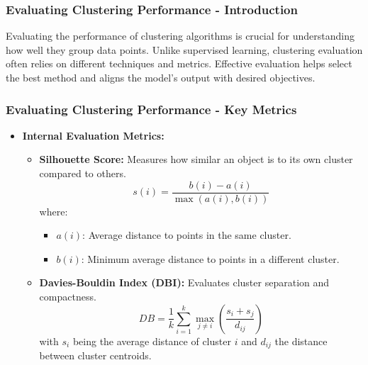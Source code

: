 \documentclass[aspectratio=169]{beamer}
\begin{document}
\begin{frame}[fragile]
    \frametitle{Evaluating Clustering Performance - Introduction}
    Evaluating the performance of clustering algorithms is crucial for understanding how well they group data points. Unlike supervised learning, clustering evaluation often relies on different techniques and metrics. Effective evaluation helps select the best method and aligns the model's output with desired objectives.
\end{frame}

\begin{frame}[fragile]
    \frametitle{Evaluating Clustering Performance - Key Metrics}
    \begin{itemize}
        \item \textbf{Internal Evaluation Metrics:}
        \begin{itemize}
            \item \textbf{Silhouette Score:} Measures how similar an object is to its own cluster compared to others.
            \begin{equation}
                s(i) = \frac{b(i) - a(i)}{\max(a(i), b(i))}
            \end{equation}
            where:
            \begin{itemize}
                \item \( a(i) \): Average distance to points in the same cluster.
                \item \( b(i) \): Minimum average distance to points in a different cluster.
            \end{itemize}
            \item \textbf{Davies-Bouldin Index (DBI):} Evaluates cluster separation and compactness.
            \begin{equation}
                DB = \frac{1}{k} \sum_{i=1}^{k} \max_{j \neq i} \left( \frac{s_i + s_j}{d_{ij}} \right)
            \end{equation}
            with \( s_i \) being the average distance of cluster \( i \) and \( d_{ij} \) the distance between cluster centroids.
        \end{itemize}
    \end{itemize}
\end{frame}
\end{document}
